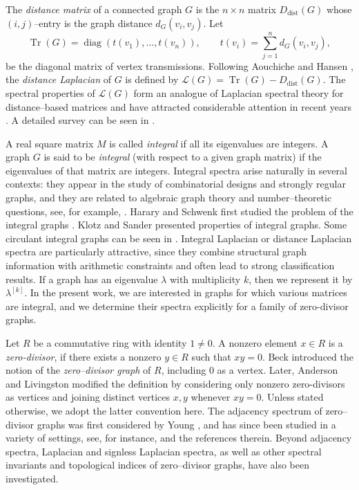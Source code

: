 \documentclass[12pt,twoside]{article}
\begin{document}
	
	The \emph{distance matrix} of a connected graph $G$ is the $n\times n$ matrix $D_{\mathrm{dist}}(G)$
	whose $(i,j)$–entry is the graph distance $d_G(v_i,v_j)$. Let
	\[
	\operatorname{Tr}(G) = \operatorname{diag}(t(v_1),\dots,t(v_n)),\qquad
	t(v_i) = \sum_{j=1}^n d_G(v_i,v_j),
	\]
	be the diagonal matrix of vertex transmissions. Following Aouchiche and Hansen
	\cite{aouchiche-hansen-distance}, the \emph{distance Laplacian} of $G$ is defined by $\mathcal{L}(G) = \operatorname{Tr}(G) - D_{\mathrm{dist}}(G).$
	The spectral properties of $\mathcal{L}(G)$ form an analogue of Laplacian spectral theory
	for distance–based matrices and have attracted considerable attention in recent years
	\cite{aouchiche-hansen-distance,Ah2013}. A detailed survey can be seen in \cite{AH3,bilalDlsurvey}.
	
	A real square matrix $M$ is called \emph{integral} if all its eigenvalues are integers. A graph
	$G$ is said to be \emph{integral} (with respect to a given graph matrix) if the eigenvalues of
	that matrix are integers. Integral spectra arise naturally in several contexts: they appear in
	the study of combinatorial designs and strongly regular graphs, and they are related to algebraic
	graph theory and number–theoretic questions, see, for example,
	\cite{cds}. Harary and Schwenk first studied the problem of the integral graphs \cite{harary-schwenk}. Klotz and Sander \cite{klotz-sander} presented properties of integral graphs. Some circulant integral graphs can be seen in \cite{so-integral}.   Integral Laplacian or
	distance Laplacian spectra are particularly attractive, since they combine structural graph
	information with arithmetic constraints and often lead to strong classification results. If a graph has an eigenvalue $\lambda$ with multiplicity $k$, then we represent it by $\lambda^{[k]}$. In the present work, we are interested in graphs for which various matrices are integral, and we determine their spectra explicitly for a family of
	zero-divisor graphs.
	
	
	
	Let $R$ be a commutative ring with identity $1\neq 0$. A nonzero element $x\in R$ is a
	\emph{zero-divisor}, if there exists a nonzero $y\in R$ such that $xy=0$. Beck
	\cite{ib} introduced the notion of the \emph{zero–divisor graph} of $R$, including $0$ as a
	vertex. Later, Anderson and Livingston \cite{al} modified the definition by considering only
	nonzero zero-divisors as vertices and joining distinct vertices $x,y$ whenever $xy=0$. Unless
	stated otherwise, we adopt the latter convention here. The adjacency spectrum of zero–divisor graphs was first considered by Young \cite{my}, and has since been studied in a variety of settings, see, for instance,
	\cite{bilalijpam,monius,fareeha,bilalcoo,bilalejgta,johnson} and the references therein.
	Beyond adjacency spectra, Laplacian and signless Laplacian spectra, as well as other spectral
	invariants and topological indices of zero–divisor graphs, have also been investigated. 
	
\end{document}
